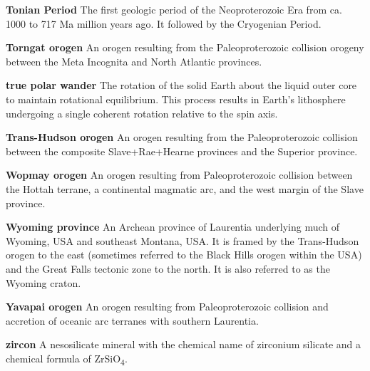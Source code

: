 \documentclass[twocolumn, switch]{article} %
\begin{document}
\noindent\textbf{Tonian Period } The first geologic period of the Neoproterozoic Era from ca. 1000 to 717 Ma million years ago. It followed by the Cryogenian Period.

\noindent\textbf{Torngat orogen } An orogen resulting from the Paleoproterozoic collision orogeny between the Meta Incognita and North Atlantic provinces.

\noindent\textbf{true polar wander } The rotation of the solid Earth about the liquid outer core to maintain rotational equilibrium. This process results in Earth's lithosphere undergoing a single coherent rotation relative to the spin axis.

\noindent\textbf{Trans-Hudson orogen } An orogen resulting from the Paleoproterozoic collision between the composite Slave+Rae+Hearne provinces and the Superior province.

\noindent\textbf{Wopmay orogen } An orogen resulting from Paleoproterozoic collision between the Hottah terrane, a continental magmatic arc, and the west margin of the Slave province.

\noindent\textbf{Wyoming province } An Archean province of Laurentia underlying much of Wyoming, USA and southeast Montana, USA. It is framed by the Trans-Hudson orogen to the east (sometimes referred to the Black Hills orogen within the USA) and the Great Falls tectonic zone to the north. It is also referred to as the Wyoming craton.

\noindent\textbf{Yavapai orogen } An orogen resulting from Paleoproterozoic collision and accretion of oceanic arc terranes with southern Laurentia.

\noindent\textbf{zircon } A nesosilicate mineral with the chemical name of zirconium silicate and a chemical formula of ZrSiO\textsubscript{4}.


\footnotesize

\newpage
\end{document}
